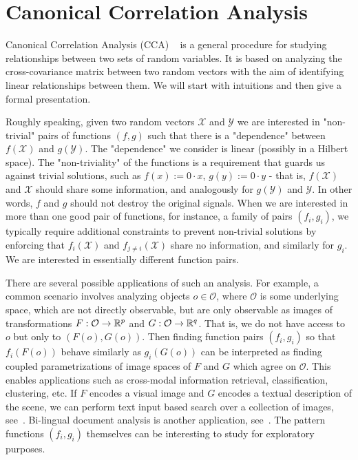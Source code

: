 %
\chapter{Canonical Correlation Analysis}

Canonical Correlation Analysis (CCA) ~\cite{Hotelling} is a general procedure for studying relationships between two sets of random variables. It is based on analyzing the cross-covariance matrix between two random vectors with the aim of identifying linear relationships between them. We will start with intuitions and then give a formal presentation.

Roughly speaking, given two random vectors $\mathcal{X}$ and $\mathcal{Y}$ we are interested in "non-trivial" pairs of functions $(f,g)$ such that there is a "dependence" between $f(\mathcal{X})$ and $g(\mathcal{Y})$. The "dependence" we consider is linear (possibly in a Hilbert space). The "non-triviality" of the functions is a requirement that guards us against trivial solutions, such as $f(x) := 0 \cdot x$, $g(y) := 0 \cdot y$ - that is, $f(\mathcal{X})$ and $\mathcal{X}$ should share some information, and analogously for $g(\mathcal{Y})$ and $\mathcal{Y}$. In other words, $f$ and $g$ should not destroy the original signals. When we are interested in more than one good pair of functions, for instance, a family of pairs $(f_i,g_i)$, we typically require additional constraints to prevent non-trivial solutions by enforcing that $f_i\left(\mathcal{X}\right)$ and $f_{j \neq i}\left(\mathcal{X}\right)$ share no information, and similarly for $g_i$. We are interested in essentially different function pairs.

There are several possible applications of such an analysis. For example, a common scenario involves analyzing objects $o \in \mathcal{O}$, where $\mathcal{O}$ is some underlying space, which are not directly observable, but are only observable as images of transformations $F: \mathcal{O} \rightarrow \mathbb{R}^p$ and $G: \mathcal{O} \rightarrow \mathbb{R}^q$. That is, we do not have access to $o$ but only to $\left(F(o), G(o)\right)$. Then finding function pairs $(f_i, g_i)$ so that $f_i(F(o))$ behave similarly as $g_i(G(o))$ can be interpreted as finding coupled parametrizations of image spaces of $F$ and $G$ which agree on $\mathcal{O}$. This enables applications such as cross-modal information retrieval, classification, clustering, etc. If $F$ encodes a visual image and $G$ encodes a textual description of the scene, we can perform text input based search over a collection of images, see~\cite{HardoonSS04}. Bi-lingual document analysis is another application, see~\cite{mrpqr}. The pattern functions $(f_i, g_i)$ themselves can be interesting to study for exploratory purposes.

